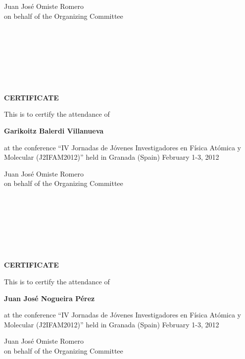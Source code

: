 \documentclass [13pt,a4paper] {letter}
\begin{document}
\vspace {4cm}
\begin{raggedleft}
Juan José Omiste Romero\\
on behalf of the Organizing Committee
\newpage
\end{raggedleft}
\begin{verbatim}







\end{verbatim}
\pagestyle{empty}
\begin{center}
{\bf {\Huge CERTIFICATE}}

\vspace {1.5cm}
This is to certify the attendance of
\vspace {1cm}

{\bf \Large  Garikoitz  Balerdi  Villanueva }
\vspace {1cm}

at the conference { \textquotedblleft IV Jornadas de Jóvenes Investigadores en Física Atómica y Molecular (J2IFAM2012)\textquotedblright} 
held in Granada (Spain) February 1-3, 2012
\end{center}
\vspace {4cm}
\begin{raggedleft}
Juan José Omiste Romero\\
on behalf of the Organizing Committee
\newpage
\end{raggedleft}
\begin{verbatim}







\end{verbatim}
\pagestyle{empty}
\begin{center}
{\bf {\Huge CERTIFICATE}}

\vspace {1.5cm}
This is to certify the attendance of
\vspace {1cm}

{\bf \Large  Juan José    Nogueira Pérez }
\vspace {1cm}

at the conference { \textquotedblleft IV Jornadas de Jóvenes Investigadores en Física Atómica y Molecular (J2IFAM2012)\textquotedblright} 
held in Granada (Spain) February 1-3, 2012
\end{center}
\vspace {4cm}
\begin{raggedleft}
Juan José Omiste Romero\\
on behalf of the Organizing Committee
\newpage
\end{raggedleft}
\begin{verbatim}







\end{verbatim}
\end{document}
